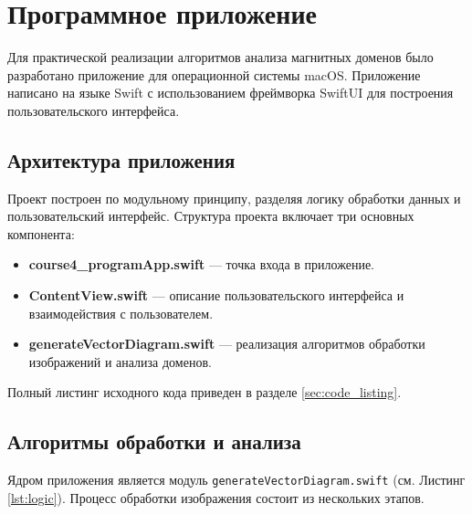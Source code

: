 \documentclass[12pt,a4paper]{article}
\numberwithin{equation}{section}
\begin{document}
\section{Программное приложение}

Для практической реализации алгоритмов анализа магнитных доменов было разработано приложение для операционной системы macOS. Приложение написано на языке Swift с использованием фреймворка SwiftUI для построения пользовательского интерфейса.

\subsection{Архитектура приложения}

Проект построен по модульному принципу, разделяя логику обработки данных и пользовательский интерфейс. Структура проекта включает три основных компонента:
\begin{itemize}
    \item \textbf{course4\_programApp.swift} --- точка входа в приложение.
    \item \textbf{ContentView.swift} --- описание пользовательского интерфейса и взаимодействия с пользователем.
    \item \textbf{generateVectorDiagram.swift} --- реализация алгоритмов обработки изображений и анализа доменов.
\end{itemize}

Полный листинг исходного кода приведен в разделе \ref{sec:code_listing}.

\subsection{Алгоритмы обработки и анализа}

Ядром приложения является модуль \texttt{generateVectorDiagram.swift} (см. Листинг \ref{lst:logic}). Процесс обработки изображения состоит из нескольких этапов.
\end{document}

